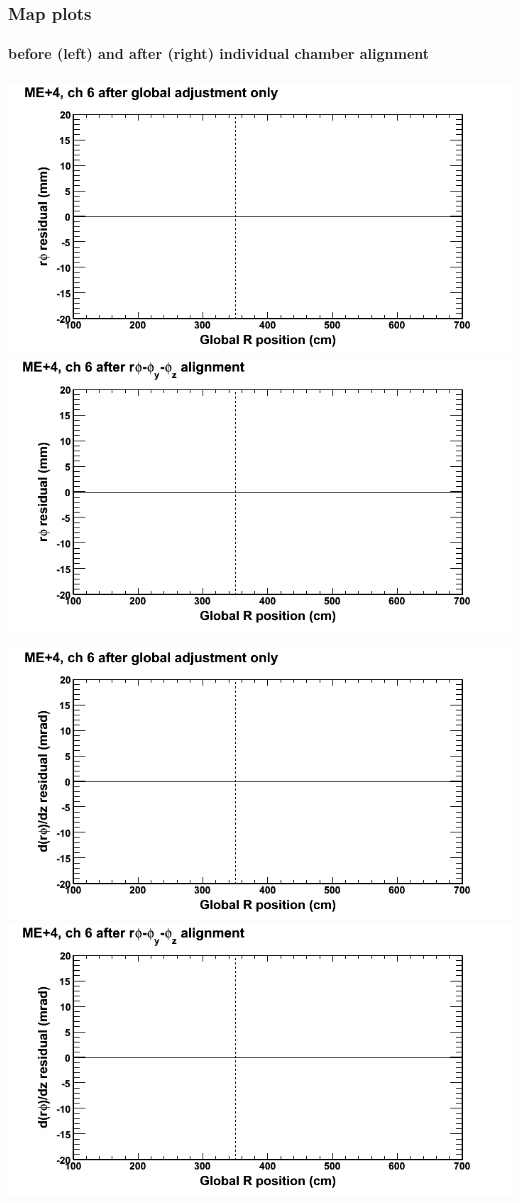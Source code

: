 \documentclass[compress]{beamer}
\begin{document}
\begin{frame}
\frametitle{Map plots}
\framesubtitle{before (left) and after (right) individual chamber alignment}
\includegraphics[width=0.5\linewidth]{ringmapplots_3dof/before_CSCvsr_mep4ch06_x.png} \includegraphics[width=0.5\linewidth]{ringmapplots_3dof/after_CSCvsr_mep4ch06_x.png}

\includegraphics[width=0.5\linewidth]{ringmapplots_3dof/before_CSCvsr_mep4ch06_dxdz.png} \includegraphics[width=0.5\linewidth]{ringmapplots_3dof/after_CSCvsr_mep4ch06_dxdz.png}
\end{frame}
\end{document}
